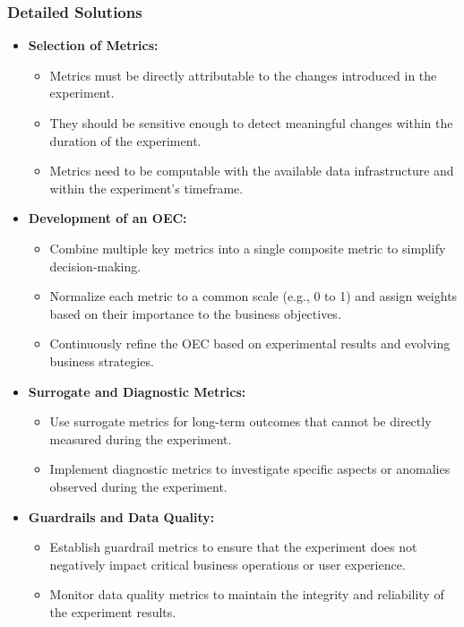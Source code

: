 \documentclass{article}
\begin{document}
\subsubsection*{Detailed Solutions}
\begin{itemize}
    \item \textbf{Selection of Metrics:}
    \begin{itemize}
        \item Metrics must be directly attributable to the changes introduced in the experiment.
        \item They should be sensitive enough to detect meaningful changes within the duration of the experiment.
        \item Metrics need to be computable with the available data infrastructure and within the experiment's timeframe.
    \end{itemize}

    \item \textbf{Development of an OEC:}
    \begin{itemize}
        \item Combine multiple key metrics into a single composite metric to simplify decision-making.
        \item Normalize each metric to a common scale (e.g., 0 to 1) and assign weights based on their importance to the business objectives.
        \item Continuously refine the OEC based on experimental results and evolving business strategies.
    \end{itemize}

    \item \textbf{Surrogate and Diagnostic Metrics:}
    \begin{itemize}
        \item Use surrogate metrics for long-term outcomes that cannot be directly measured during the experiment.
        \item Implement diagnostic metrics to investigate specific aspects or anomalies observed during the experiment.
    \end{itemize}

    \item \textbf{Guardrails and Data Quality:}
    \begin{itemize}
        \item Establish guardrail metrics to ensure that the experiment does not negatively impact critical business operations or user experience.
        \item Monitor data quality metrics to maintain the integrity and reliability of the experiment results.
    \end{itemize}
\end{itemize}
\end{document}
